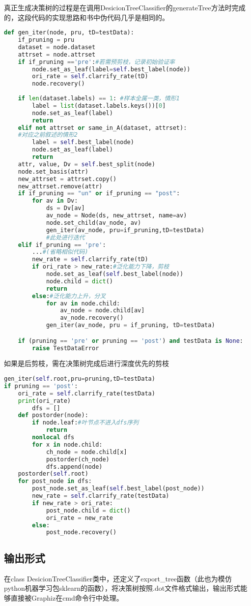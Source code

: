 \documentclass[UTF8]{ctexart}
\begin{document}
真正生成决策树的过程是在调用DesicionTreeClassifier的generateTree方法时完成的，这段代码的实现思路和书中伪代码几乎是相同的。
\begin{lstlisting}[language = python]
def gen_iter(node, pru, tD=testData):
	if_pruning = pru
	dataset = node.dataset
	attrset = node.attrset
	if if_pruning =='pre':#若需预剪枝，记录初始验证率
		node.set_as_leaf(label=self.best_label(node))
		ori_rate = self.clarrify_rate(tD)	
		node.recovery()
	
	if len(dataset.labels) == 1: #样本全属一类，情形1
		label = list(dataset.labels.keys())[0]
		node.set_as_leaf(label)
		return
	elif not attrset or same_in_A(dataset, attrset):
	#对应之前叙述的情形2
		label = self.best_label(node)
		node.set_as_leaf(label)
		return
	attr, value, Dv = self.best_split(node)
	node.set_basis(attr)
	new_attrset = attrset.copy()
	new_attrset.remove(attr)
	if if_pruning == "un" or if_pruning == "post":
		for av in Dv:
			ds = Dv[av]
			av_node = Node(ds, new_attrset, name=av)
			node.set_child(av_node, av)
			gen_iter(av_node, pru=if_pruning,tD=testData)
			#此处进行迭代
	elif if_pruning == 'pre':
		...#(省略相似代码)
		new_rate = self.clarrify_rate(tD)
		if ori_rate > new_rate:#泛化能力下降，剪枝
			node.set_as_leaf(self.best_label(node))
			node.child = dict()
			return
		else:#泛化能力上升，分叉
			for av in node.child:
				av_node = node.child[av]
				av_node.recovery()
			gen_iter(av_node, pru = if_pruning, tD=testData)

	if (pruning == 'pre' or pruning == 'post') and testData is None:
		raise TestDataError
\end{lstlisting}

如果是后剪枝，需在决策树完成后进行深度优先的剪枝
\begin{lstlisting}[language=python]
gen_iter(self.root,pru=pruning,tD=testData)
if pruning == 'post':
	ori_rate = self.clarrify_rate(testData)
	print(ori_rate)
		dfs = []           
	def postorder(node):
		if node.leaf:#叶节点不进入dfs序列
			return
		nonlocal dfs
		for x in node.child:
			ch_node = node.child[x]
			postorder(ch_node)
			dfs.append(node)
	postorder(self.root)
	for post_node in dfs:
		post_node.set_as_leaf(self.best_label(post_node))
		new_rate = self.clarrify_rate(testData)
		if new_rate > ori_rate:
			post_node.child = dict()
			ori_rate = new_rate
		else:
			post_node.recovery()
\end{lstlisting}

\subsection{输出形式}
在class DesicionTreeClassifier类中，还定义了export\_tree函数（此也为模仿python机器学习包sklearn的函数），将决策树按照.dot文件格式输出，输出形式能够直接被Graphiz在cmd命令行中处理。
\end{document}

